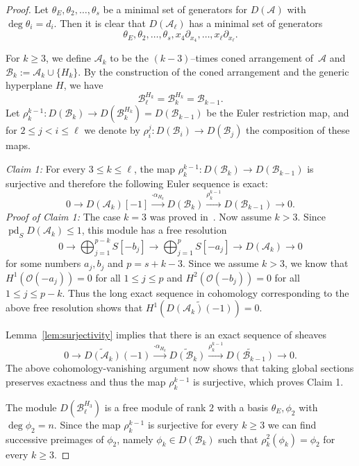 \documentclass[10pt,a4paper]{amsart}
\DeclareMathOperator{\pd}{pd}
\def\A{{\mathcal{A}}}%
\def\B{{\mathcal{B}}}%
\def\O{{\mathcal{O}}}%
\begin{document}
\begin{proof}
Let $\theta_E,\theta_2,\ldots,\theta_s$ be a minimal set of generators for $D(\A)$ with $\deg \theta_i=d_i$. Then it is clear that $D(\A_\ell)$ has a minimal set of generators 
$$
\theta_E,\theta_2,\ldots,\theta_s,x_4\partial_{x_4},\ldots,x_\ell\partial_{x_\ell}.
$$

For $k\ge 3$, we define $\A_k$ to be the $(k-3)$--times coned arrangement of~$\A$ and
$\B_k:=\A_k \cup \{H_k\}$.
By the construction of the coned arrangement and the generic hyperplane $H$, we have
\[
	\B_\ell^{H_k}=\B_k^{H_k} = \B_{k-1}.
\]
Let $\rho_k^{k-1}:D(\B_k)\to D(\B_k^{H_k})=D(\B_{k-1})$ be the Euler restriction map, and for $2\le j < i \le \ell$ we denote by $\rho_i^j:D(\B_i)\to D(\B_j)$ the composition of these maps.

\emph{Claim 1:} For every $3\le k \le \ell$, the map $\rho_k^{k-1}:D(\B_k)\to D(\B_{k-1})$ is surjective and therefore the following Euler sequence is exact:
\begin{equation}\label{eq:exact_euler}
0 \rightarrow D(\A_k)[-1] \stackrel{\cdot \alpha_{H_k}}{\rightarrow}
D(\B_k) \stackrel{\rho_k^{k-1}}{\rightarrow } D(\B_{k-1}) \rightarrow 0.
\end{equation}
\emph{Proof of Claim 1:}
The case $k=3$ was proved in~.
Now assume $k>3$.
Since $\pd_S D(\A_k)\le 1$, this module has a free resolution
$$
0 \rightarrow 
\bigoplus_{j=1}^{p - k} S[-b_j]
\rightarrow 
\bigoplus_{j=1}^{p} S[-a_j]
\rightarrow D(\A_k) \rightarrow 0
$$
for some numbers $a_j, b_j$ and $p=s+k-3$.
Since we assume $k>3$, we know that $H^1(\O(-a_j))=0$ for all $1\le j \le p$ and $H^2(\O(-b_j))=0$ for all $1\le j \le p-k$.
Thus the long exact sequence in cohomology corresponding to the above free resolution shows that $H^1(\widetilde{D(\A_k)(-1)})=0$.

Lemma~\ref{lem:surjectivity} implies that there is an exact sequence of sheaves
\[
0 \rightarrow 
\widetilde{D(\A_k)}(-1) \stackrel{\cdot \alpha_{H_k}}{\rightarrow}
\widetilde{D(\B_k)} \stackrel{\rho_k^{k-1}}{\rightarrow}
\widetilde{D(\B_{k-1})} \rightarrow 0.
\]
The above cohomology-vanishing argument now shows that taking global sections preserves exactness and thus the map $\rho_k^{k-1}$ is surjective, which proves Claim 1.

The module $D(\B_\ell^{H_3})$ is a free module of rank $2$ with a basis $\theta_E,\phi_2$ with $\deg \phi_2 = n$.
Since the map $\rho_k^{k-1}$ is surjective for every $k\ge 3$ we can find successive preimages of $\phi_2$, namely $\phi_k\in D(\B_k)$ such that $\rho_k^2(\phi_k)=\phi_2$ for every $k\ge 3$.


\end{proof}
\end{document}

